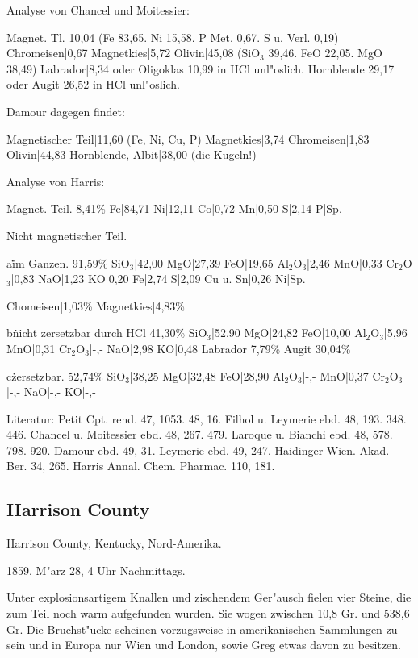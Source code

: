 \documentclass[a4paper, 11pt, oneside]{article}
\begin{document}
Analyse von Chancel und Moitessier:

Magnet. Tl. 10,04 (Fe 83,65. Ni 15,58. P Met. 0,67. S u. Verl. 0,19)  
Chromeisen|0,67  
Magnetkies|5,72  
Olivin|45,08 (SiO$_{3}$ 39,46. FeO 22,05. MgO 38,49)  
Labrador|8,34 oder Oligoklas 10,99 in HCl unl"oslich.  
Hornblende 29,17 oder Augit 26,52 in HCl unl"oslich.

Damour dagegen findet:

Magnetischer Teil|11,60 (Fe, Ni, Cu, P)  
Magnetkies|3,74  
Chromeisen|1,83  
Olivin|44,83  
Hornblende, Albit|38,00 (die Kugeln!)

Analyse von Harris:

Magnet. Teil. 8,41\%  
Fe|84,71  
Ni|12,11  
Co|0,72  
Mn|0,50  
S|2,14  
P|Sp.

Nicht magnetischer Teil.

a\. im Ganzen. 91,59\%
SiO$_{3}$|42,00  
MgO|27,39  
FeO|19,65  
Al$_{2}$O$_{3}$|2,46  
MnO|0,33  
Cr$_{2}$O$_{3}$|0,83  
NaO|1,23  
KO|0,20  
Fe|2,74  
S|2,09  
Cu u. Sn|0,26  
Ni|Sp.

Chomeisen|1,03\%
Magnetkies|4,83\%

b\. nicht zersetzbar durch HCl 41,30\%
SiO$_{3}$|52,90  
MgO|24,82  
FeO|10,00  
Al$_{2}$O$_{3}$|5,96  
MnO|0,31  
Cr$_{2}$O$_{3}$|-,-  
NaO|2,98  
KO|0,48  
Labrador 7,79\%
Augit 30,04\%

c\. zersetzbar. 52,74\%
SiO$_{3}$|38,25  
MgO|32,48  
FeO|28,90  
Al$_{2}$O$_{3}$|-,-  
MnO|0,37  
Cr$_{2}$O$_{3}$|-,-  
NaO|-,-  
KO|-,-  

Literatur: Petit Cpt. rend. 47, 1053. 48, 16. Filhol u. Leymerie ebd. 48, 193. 348. 446. Chancel u. Moitessier ebd. 48, 267. 479. Laroque u. Bianchi ebd. 48, 578. 798. 920. Damour ebd. 49, 31. Leymerie ebd. 49, 247. Haidinger Wien. Akad. Ber. 34, 265. Harris Annal. Chem. Pharmac. 110, 181.

\subsection{Harrison County}

Harrison County, Kentucky, Nord-Amerika.

1859, M"arz 28, 4 Uhr Nachmittags.

Unter explosionsartigem Knallen und zischendem Ger"ausch fielen vier Steine, die zum Teil noch warm aufgefunden wurden. Sie wogen zwischen 10,8 Gr. und 538,6 Gr. Die Bruchst"ucke scheinen vorzugsweise in amerikanischen Sammlungen zu sein und in Europa nur Wien und London, sowie Greg etwas davon zu besitzen.
\end{document}
